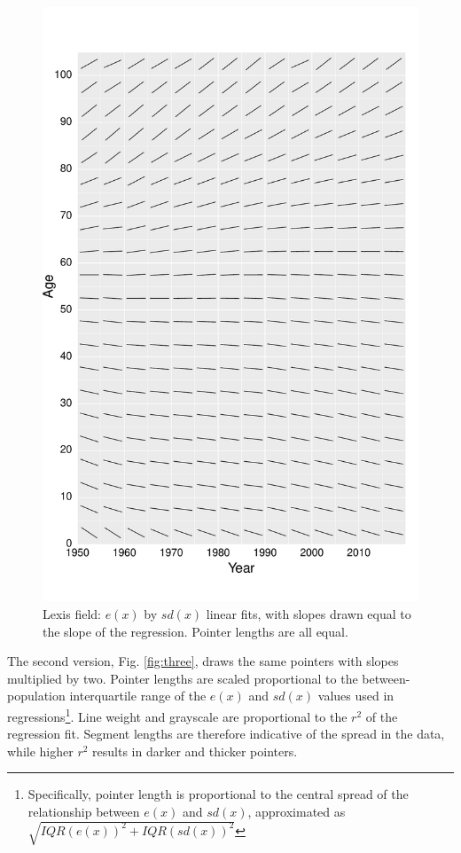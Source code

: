 \documentclass[10pt, twoside, parskip=half]{article}
\begin{document}
\begin{figure}[!t]

{\centering \includegraphics[width=0.8\linewidth]{Figures/FigApp1} 

}

\caption{Lexis field: \(e(x)\) by \(sd(x)\) linear fits, with slopes drawn equal to the slope of the regression. Pointer lengths are all equal.}\label{fig:two}
\end{figure}

The second version, Fig. \ref{fig:three}, draws the same pointers with slopes multiplied by two. Pointer lengths are scaled proportional to the between-population interquartile range of the \(e(x)\) and \(sd(x)\) values used in regressions\footnote{Specifically, pointer length is proportional to the central spread of the relationship between \(e(x)\) and \(sd(x)\), approximated as \(\sqrt{IQR(e(x))^2 + IQR(sd(x))^2}\)}. Line weight and grayscale are proportional to the \(r^2\) of the regression fit. Segment lengths are therefore indicative of the spread in the data, while higher \(r^2\) results in darker and thicker pointers.
\end{document}
